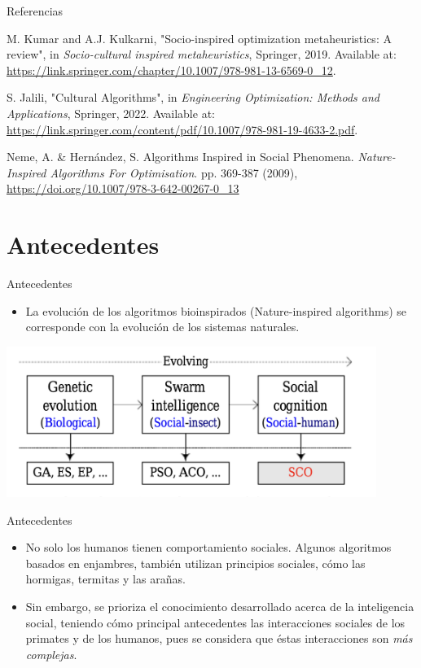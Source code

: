 \documentclass{beamer}
\begin{document}
\begin{frame}{Referencias}
\begin{thebibliography}{30}

M. Kumar and A.J. Kulkarni,
"Socio-inspired optimization metaheuristics: A review",
in \textit{Socio-cultural inspired metaheuristics}, Springer, 2019.
Available at: \url{https://link.springer.com/chapter/10.1007/978-981-13-6569-0_12}.

S. Jalili,
"Cultural Algorithms",
in \textit{Engineering Optimization: Methods and Applications}, Springer, 2022.
Available at: \url{https://link.springer.com/content/pdf/10.1007/978-981-19-4633-2.pdf}.

Neme, A. \& Hernández, S. Algorithms Inspired in Social Phenomena. {\em Nature-Inspired Algorithms For Optimisation}. pp. 369-387 (2009),  \url{https://doi.org/10.1007/978-3-642-00267-0_13}

\end{thebibliography}
\end{frame}


\section{Antecedentes}
\begin{frame}{Antecedentes}
    \begin{itemize}
        \item La evolución de los algoritmos bioinspirados (Nature-inspired algorithms) se corresponde con la evolución de los sistemas naturales.         
    \end{itemize}

    \vspace{0.5cm}
    \centering
    \includegraphics[width=0.9\textwidth]{classification_1.png}

\end{frame}

\begin{frame}{Antecedentes}
\begin{itemize}
    \item No solo los humanos tienen comportamiento sociales. Algunos algoritmos basados en enjambres, también utilizan principios sociales, cómo las hormigas, termitas y las arañas.
    \item Sin embargo, se prioriza el conocimiento desarrollado acerca de la inteligencia social, teniendo cómo principal antecedentes las interacciones sociales de los primates y de los humanos, pues se considera que éstas interacciones son \textit{más complejas}.
\end{itemize}
\end{frame}
\end{document}
